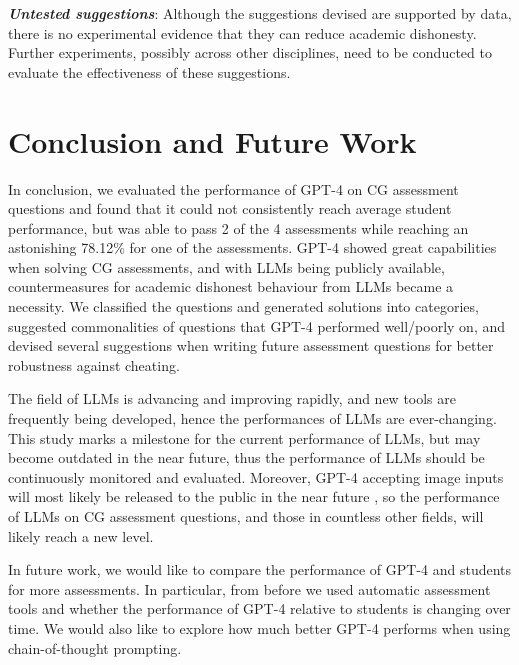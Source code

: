 \documentclass[sigconf,review]{acmart}
\begin{document}
\noindent \textit{\textbf{Untested suggestions}}: Although the suggestions devised are supported by data, there is no experimental evidence that they can reduce academic dishonesty. Further experiments, possibly across other disciplines, need to be conducted to evaluate the effectiveness of these suggestions.

\section{Conclusion and Future Work}

In conclusion, we evaluated the performance of GPT-4 on CG assessment questions and found that it could not consistently reach average student performance, but was able to pass 2 of the 4 assessments while reaching an astonishing 78.12\% for one of the assessments. GPT-4 showed great capabilities when solving CG assessments, and with LLMs being publicly available, countermeasures for academic dishonest behaviour from LLMs became a necessity. We classified the questions and generated solutions into categories, suggested commonalities of questions that GPT-4 performed well/poorly on, and devised several suggestions when writing future assessment questions for better robustness against cheating.

The field of LLMs is advancing and improving rapidly, and new tools are frequently being developed, hence the performances of LLMs are ever-changing. This study marks a milestone for the current performance of LLMs, but may become outdated in the near future, thus the performance of LLMs should be continuously monitored and evaluated. Moreover, GPT-4 accepting image inputs will most likely be released to the public in the near future \cite{gpt4images}, so the performance of LLMs on CG assessment questions, and those in countless other fields, will likely reach a new level.

In future work, we would like to compare the performance of GPT-4 and students for more assessments. In particular, from before we used automatic assessment tools and whether the performance of GPT-4 relative to students is changing over time. We would also like to explore how much better GPT-4 performs when using chain-of-thought prompting.



\end{document}

